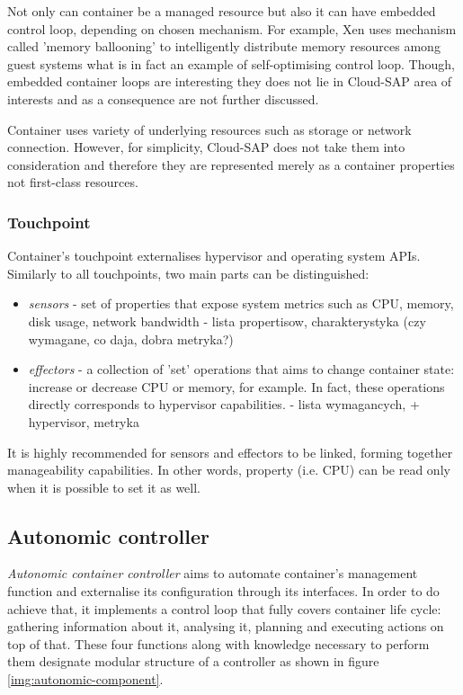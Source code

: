Not only can container be a managed resource but also it can have embedded control loop, depending on chosen mechanism. For example, Xen uses mechanism called 'memory ballooning' to intelligently distribute memory resources among guest systems what is in fact an example of self-optimising control loop. Though, embedded container loops are interesting they does not lie in Cloud-SAP area of interests and as a consequence are not further discussed.

Container uses variety of underlying resources such as storage or network connection. However, for simplicity, Cloud-SAP does not take them into consideration and therefore they are represented merely as a container properties not first-class resources.

\subsubsection{Touchpoint}
Container's touchpoint externalises hypervisor and operating system APIs. Similarly to all touchpoints, two main parts can be distinguished:
\begin{itemize}
 \item \emph{sensors} - set of properties that expose system metrics such as CPU, memory, disk usage, network bandwidth - lista propertisow, charakterystyka (czy wymagane, co daja, dobra metryka?)
 \item \emph{effectors} - a collection of 'set' operations that aims to change container state: increase or decrease CPU or memory, for example. In fact, these operations directly corresponds to hypervisor capabilities. - lista wymagancych, + hypervisor, metryka
\end{itemize}

It is highly recommended for sensors and effectors to be linked, forming together manageability capabilities. In other words, property (i.e. CPU) can be read only when it is possible to set it as well. 

\subsection{Autonomic controller}
\emph{Autonomic container controller} aims to automate container's management function and externalise its configuration through its interfaces. In order to do achieve that, it implements a control loop that fully covers container life cycle: gathering information about it, analysing it, planning and executing actions on top of that. These four functions along with knowledge necessary to perform them designate modular structure of a controller as shown in figure \ref{img:autonomic-component}.

